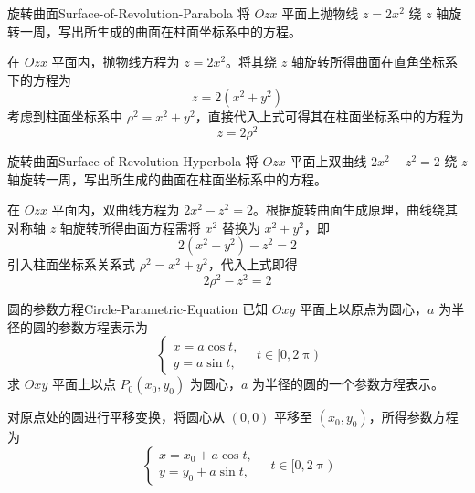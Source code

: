 \begin{problem}{旋转曲面}{Surface-of-Revolution-Parabola}
    将 $Ozx$ 平面上抛物线 $z = 2x^2$ 绕 $z$ 轴旋转一周，写出所生成的曲面在柱面坐标系中的方程。
\end{problem}

\begin{solution}
    在 $Ozx$ 平面内，抛物线方程为 $z = 2x^2$。将其绕 $z$ 轴旋转所得曲面在直角坐标系下的方程为
    \begin{equation*}
        z = 2(x^2 + y^2)
    \end{equation*}
    考虑到柱面坐标系中 $\rho^2 = x^2 + y^2$，直接代入上式可得其在柱面坐标系中的方程为
    \begin{equation*}
        \boxed{z = 2\rho^2}
    \end{equation*}
\end{solution}

\begin{problem}{旋转曲面}{Surface-of-Revolution-Hyperbola}
    将 $Ozx$ 平面上双曲线 $2x^2 - z^2 = 2$ 绕 $z$ 轴旋转一周，写出所生成的曲面在柱面坐标系中的方程。
\end{problem}

\begin{solution}
    在 $Ozx$ 平面内，双曲线方程为 $2x^2 - z^2 = 2$。根据旋转曲面生成原理，曲线绕其对称轴 $z$ 轴旋转所得曲面方程需将 $x^2$ 替换为 $x^2 + y^2$，即
    \begin{equation*}
        2(x^2 + y^2) - z^2 = 2
    \end{equation*}
    引入柱面坐标系关系式 $\rho^2 = x^2 + y^2$，代入上式即得
    \begin{equation*}
        \boxed{2\rho^2 - z^2 = 2}
    \end{equation*}
\end{solution}


\begin{problem}{圆的参数方程}{Circle-Parametric-Equation}
    已知 $Oxy$ 平面上以原点为圆心，$a$ 为半径的圆的参数方程表示为
    \begin{equation*}
        \begin{cases}
            x = a \cos t, \\
            y = a \sin t,
        \end{cases} \quad t \in [0, 2\uppi)
    \end{equation*}
    求 $Oxy$ 平面上以点 $P_0(x_0, y_0)$ 为圆心，$a$ 为半径的圆的一个参数方程表示。
\end{problem}

\begin{solution}
    对原点处的圆进行平移变换，将圆心从 $(0, 0)$ 平移至 $(x_0, y_0)$，所得参数方程为
    \begin{equation*}
        \boxed{
        \begin{cases}
            x = x_0 + a \cos t, \\
            y = y_0 + a \sin t,
        \end{cases} \quad t \in [0, 2\uppi)
        }
    \end{equation*}
\end{solution}


